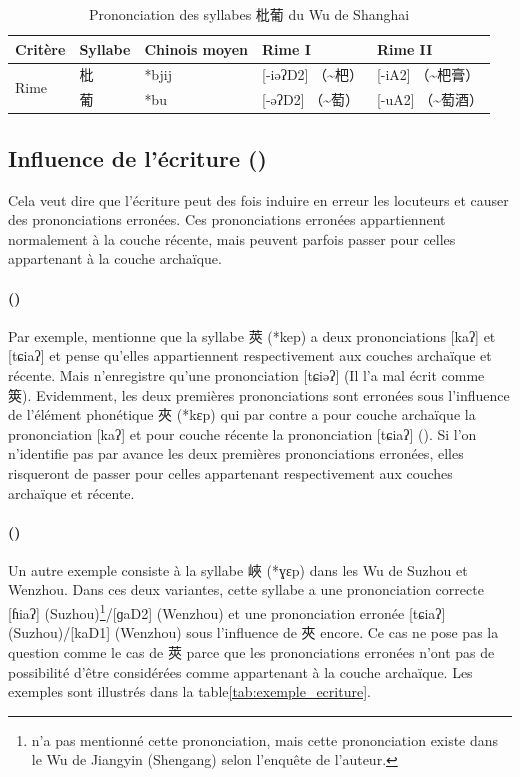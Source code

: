 \documentclass{scrbook}
\newcounter{c}[subsubsection]
\newcommand{\stpc}[1]{\stepcounter{#1}}
\newcommand{\bolang}{\textasciitilde}
\newcommand{\difwenbai}{couches archaïque et récente\xspace}
\newcommand{\illustre}{Les exemples sont illustrés dans la table\xspace}
\begin{document}
\begin{sloppypar}
\begin{table}[htbp]
  \centering
    \begin{tabular}{lllll}
    \toprule
    Critère & Syllabe & Chinois moyen  & Rime I & Rime II \\
    \midrule
    \multirow{2}[2]{*}{Rime} & 枇 & *bjij  & [-iəʔD2] （\bolang 杷） & [-iA2] （\bolang 杷膏） \\
          & 葡 & *bu   & [-əʔD2] （\bolang 萄） & [-uA2] （\bolang 萄酒） \\
    \bottomrule
    \end{tabular}%
  \caption{Prononciation des syllabes 枇葡 du Wu de Shanghai}
  \label{tab:exemple_homo}%
\end{table}%

\subsection{Influence de l'écriture (\cite[138]{Shen1988shanghai})}\label{phenom5}
Cela veut dire que l'écriture peut des fois induire en erreur les locuteurs et causer des prononciations erronées. Ces prononciations erronées appartiennent normalement à la couche récente, mais peuvent parfois passer pour celles appartenant à la couche archaïque. 

\stpc{c}\paragraph{()}
Par exemple, \textcite[21]{Ye1988suzhou} mentionne que la syllabe 莢 (*kep) a deux prononciations [kaʔ] et [tɕiaʔ] et pense qu'elles appartiennent respectivement aux \difwenbai. Mais \textcite[184]{Ye1988suzhou_fangyanzhi} n'enregistre qu'une prononciation [tɕiəʔ] (Il l'a mal écrit comme 筴). Evidemment, les deux premières prononciations sont erronées sous l'influence de l'élément phonétique 夾 (*kɛp) qui par contre a pour couche archaïque la prononciation [kaʔ] et pour couche récente la prononciation [tɕiaʔ] (\cite[21]{Ye1988suzhou}). Si l'on n'identifie pas par avance les deux premières prononciations erronées, elles risqueront de passer pour celles appartenant respectivement aux \difwenbai.

\stpc{c}\paragraph{()}
Un autre exemple consiste à la syllabe 峽 (*ɣɛp) dans les Wu de Suzhou et Wenzhou. Dans ces deux variantes, cette syllabe a une prononciation correcte [ɦiaʔ] (Suzhou)\footnote{\textcite{Ye1988suzhou_fangyanzhi} n'a pas mentionné cette prononciation, mais cette prononciation existe dans le Wu de Jiangyin (Shengang) selon l'enquête de l'auteur.}/[ɡaD2] (Wenzhou) et une prononciation erronée [tɕiaʔ] (Suzhou)/[kaD1] (Wenzhou) sous l'influence de 夾 encore. Ce cas ne pose pas la question comme le cas de 莢 parce que les prononciations erronées n'ont pas de possibilité d'être considérées comme appartenant à la couche archaïque. \illustre \ref{tab:exemple_ecriture}.


\end{sloppypar}
\end{document}
